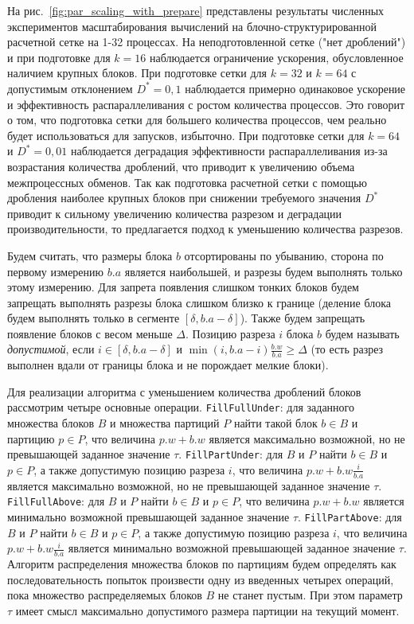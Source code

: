 \documentclass[a4paper,14pt]{extarticle}                     %
\theoremstyle{plain}                                         %
\begin{document}
На рис.~\ref{fig:par_scaling_with_prepare} представлены результаты численных экспериментов масштабирования вычислений на блочно-структурированной расчетной сетке на 1-32 процессах.
На неподготовленной сетке ("нет дроблений") и при подготовке для $k = 16$ наблюдается ограничение ускорения, обусловленное наличием крупных блоков. 
При подготовке сетки для $k = 32$ и $k = 64$ с допустимым отклонением $D^{*} = 0{,}1$ наблюдается примерно одинаковое ускорение и эффективность распараллеливания с ростом количества процессов.
Это говорит о том, что подготовка сетки для большего количества процессов, чем реально будет использоваться для запусков, избыточно.
При подготовке сетки для $k = 64$ и $D^{*} = 0{,}01$ наблюдается деградация эффективности распараллеливания из-за возрастания количества дроблений, что приводит к увеличению объема межпроцессных обменов.
Так как подготовка расчетной сетки с помощью дробления наиболее крупных блоков при снижении требуемого значения $D^{*}$ приводит к сильному увеличению количества разрезом и деградации производительности, то предлагается подход к уменьшению количества разрезов.

Будем считать, что размеры блока $b$ отсортированы по убыванию, сторона по первому измерению $b.a$ является наибольшей, и разрезы будем выполнять только этому измерению.
Для запрета появления слишком тонких блоков будем запрещать выполнять разрезы блока слишком близко к границе (деление блока будем выполнять только в сегменте $[\delta, b.a - \delta]$).
Также будем запрещать появление блоков с весом меньше $\Delta$.
Позицию разреза $i$ блока $b$ будем называть \textit{допустимой}, если $i \in [\delta, b.a - \delta]$ и $\min(i, b.a - i)\frac{b.w}{b.a} \ge \Delta$ (то есть разрез выполнен вдали от границы блока и не порождает мелкие блоки).

Для реализации алгоритма с уменьшением количества дроблений блоков рассмотрим четыре основные операции.
\texttt{FillFullUnder}: для заданного множества блоков $B$ и множества партиций $P$ найти такой блок $b \in B$ и партицию $p \in P$, что величина $p.w + b.w$ является максимально возможной, но не превышающей заданное значение $\tau$.
\texttt{FillPartUnder}: для $B$ и $P$ найти $b \in B$ и $p \in P$, а также допустимую позицию разреза $i$, что величина $p.w + b.w \frac{i}{b.a}$ является максимально возможной, но не превышающей заданное значение $\tau$.
\texttt{FillFullAbove}: для $B$ и $P$ найти $b \in B$ и $p \in P$, что величина $p.w + b.w$ является минимально возможной превышающей заданное значение $\tau$.
\texttt{FillPartAbove}: для $B$ и $P$ найти $b \in B$ и $p \in P$, а также допустимую позицию разреза $i$, что величина $p.w + b.w \frac{i}{b.a}$ является минимально возможной превышающей заданное значение $\tau$.
Алгоритм распределения множества блоков по партициям будем определять как последовательность попыток произвести одну из введенных четырех операций, пока множество распределяемых блоков $B$ не станет пустым.
При этом параметр $\tau$ имеет смысл максимально допустимого размера партиции на текущий момент.
\end{document}

